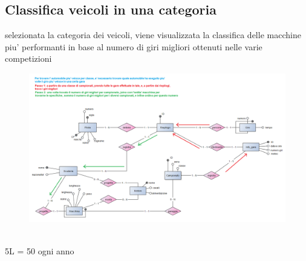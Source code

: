 \documentclass[a4paper,12pt]{report}
\begin{document}
			\subsection{Classifica veicoli in una categoria}
		selezionata la categoria dei veicoli, viene visualizzata la classifica delle macchine piu' performanti in base al numero
		di giri migliori ottenuti nelle varie competizioni
		\begin{figure}[htbp]
			\centering
			\includegraphics[scale=0.8]{copies/navigazioneClassifica.png}
		\end{figure}
		\begin{table}[!htb]
			\centering
			\begin{center}
			\newline\\
			5L = 50 ogni anno\\
			\end{center}
		\end{table}\\
\end{document}
